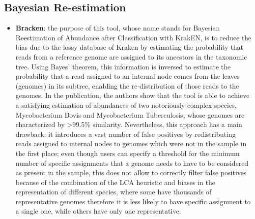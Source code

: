 \subsection{Bayesian Re-estimation}
\begin{itemize}
    \item \textbf{Bracken}: the purpose of this tool, whose name stands for Bayesian Reestimation of Abundance after Classification with KrakEN, is to reduce the bias due to the lossy database of Kraken by estimating the probability that reads from a reference genome are assigned to its ancestors in the taxonomic tree. Using Bayes' theorem, this information is inversed to estimate the probability that a read assigned to an internal node comes from the leaves (genomes) in its subtree, enabling the re-distribution of those reads to the genomes. In the publication, the authors show that the tool is able to achieve a satisfying estimation of abundances of two notoriously complex species, Mycobacterium Bovis and Mycobacterium Tuberculosis, whose genomes are characterized by >99.5\% similarity. Nevertheless, this approach has a main drawback: it introduces a vast number of false positives by redistributing reads assigned to internal nodes to genomes which were not in the sample in the first place; even though users can specify a threshold for the minimum number of specific assignments that a genome needs to have to be considered as present in the sample, this does not allow to correctly filter false positives because of the combination of the LCA heuristic and biases in the representation of different species, where some have thousands of representative genomes therefore it is less likely to have specific assignment to a single one, while others have only one representative.
\end{itemize}

